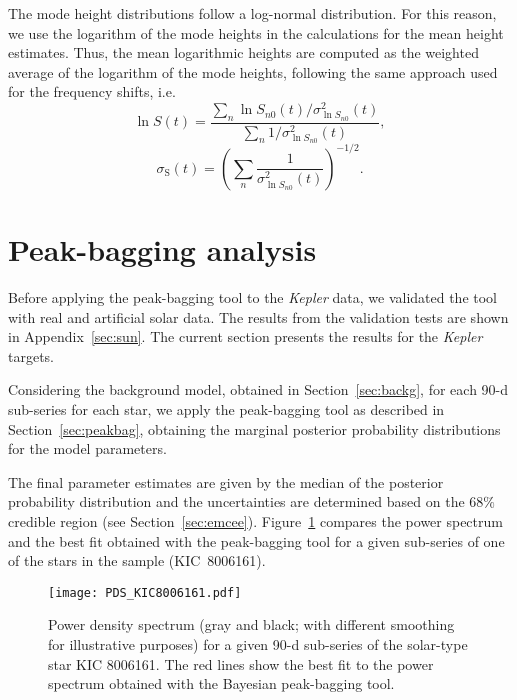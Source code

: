\documentclass[twocolumn]{aastex61}%
\begin{document}
The mode height distributions follow a log-normal distribution. For this reason, we use the logarithm of the mode heights in the calculations for the mean height estimates. Thus, the mean logarithmic heights are computed as the weighted average of the logarithm of the mode heights, following the same approach used for the frequency shifts, i.e.
\begin{equation}
\ln S (t)=\dfrac{\sum_n\ln S_{n0}(t)/\sigma_{\ln S_{n0}}^2(t)}{\sum_{n}1/\sigma_{\ln S_{n0}}^2(t)},
\end{equation}
\begin{equation}
\sigma_\text{S}(t)=\left(\sum_n\dfrac{1}{\sigma_{\ln S_{n0}}^2(t)}\right)^{-1/2}.
\end{equation}

\section{Peak-bagging analysis}\label{sec:kepler}

Before applying the peak-bagging tool to the {\it Kepler} data, we validated the tool with real and artificial solar data. The results from the validation tests are shown in Appendix~\ref{sec:sun}. The current section presents the results for the {\it Kepler} targets.

Considering the background model, obtained in Section~\ref{sec:backg}, for each 90-d sub-series for each star, we apply the peak-bagging tool as described in Section~\ref{sec:peakbag}, obtaining the marginal posterior probability distributions for the model parameters.

The final parameter estimates are given by the median of the posterior probability distribution and the uncertainties are determined based on the $68\%$ credible region (see Section~\ref{sec:emcee}). Figure~\ref{fig:pdskepler} compares the power spectrum and the best fit obtained with the peak-bagging tool for a given sub-series of one of the stars in the sample (KIC~8006161). 

\begin{figure}[h]
\texttt{[image: PDS\_KIC8006161.pdf]}\vspace{-0.27cm}
\caption{Power density spectrum (gray and black; with different smoothing for illustrative purposes) for a given 90-d sub-series of the solar-type star KIC 8006161. The red lines show the best fit to the power spectrum obtained with the Bayesian peak-bagging tool.}\label{fig:pdskepler}\vspace{-0.45cm}
\end{figure}
\end{document}
